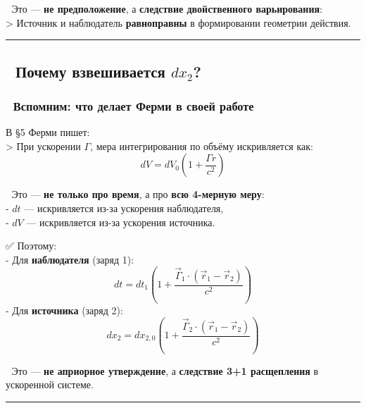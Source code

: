 \documentclass[11pt]{article}
\begin{document}
📌 Это --- \textbf{не предположение}, а \textbf{следствие двойственного
варьирования}:\\
\textgreater{} Источник и наблюдатель \textbf{равноправны} в
формировании геометрии действия.

\begin{center}\rule{0.5\linewidth}{\linethickness}\end{center}

\subsection{\texorpdfstring{🔁 Почему взвешивается
\(dx_2\)?}{🔁 Почему взвешивается dx\_2?}}\label{ux43fux43eux447ux435ux43cux443-ux432ux437ux432ux435ux448ux438ux432ux430ux435ux442ux441ux44f-dx_2}

\subsubsection{🔹 Вспомним: что делает Ферми в своей
работе}\label{ux432ux441ux43fux43eux43cux43dux438ux43c-ux447ux442ux43e-ux434ux435ux43bux430ux435ux442-ux444ux435ux440ux43cux438-ux432-ux441ux432ux43eux435ux439-ux440ux430ux431ux43eux442ux435}

В §5 Ферми пишет:\\
\textgreater{} При ускорении \(\Gamma\), мера интегрирования по объёму
искривляется как:\\
\[
dV = dV_0 \left( 1 + \frac{\Gamma r}{c^2} \right)
\]

📌 Это --- \textbf{не только про время}, а про \textbf{всю 4-мерную
меру}:\\
- \(dt\) --- искривляется из-за ускорения наблюдателя,\\
- \(dV\) --- искривляется из-за ускорения источника.

✅ Поэтому:\\
- Для \textbf{наблюдателя} (заряд 1):\\
\[
  dt = dt_1 \left( 1 + \frac{\vec{\Gamma}_1 \cdot (\vec{r}_1 - \vec{r}_2)}{c^2} \right)
  \] - Для \textbf{источника} (заряд 2):\\
\[
  dx_2 = dx_{2,0} \left( 1 + \frac{\vec{\Gamma}_2 \cdot (\vec{r}_1 - \vec{r}_2)}{c^2} \right)
  \]

📌 Это --- \textbf{не априорное утверждение}, а \textbf{следствие 3+1
расщепления} в ускоренной системе.

\begin{center}\rule{0.5\linewidth}{\linethickness}\end{center}
\end{document}
